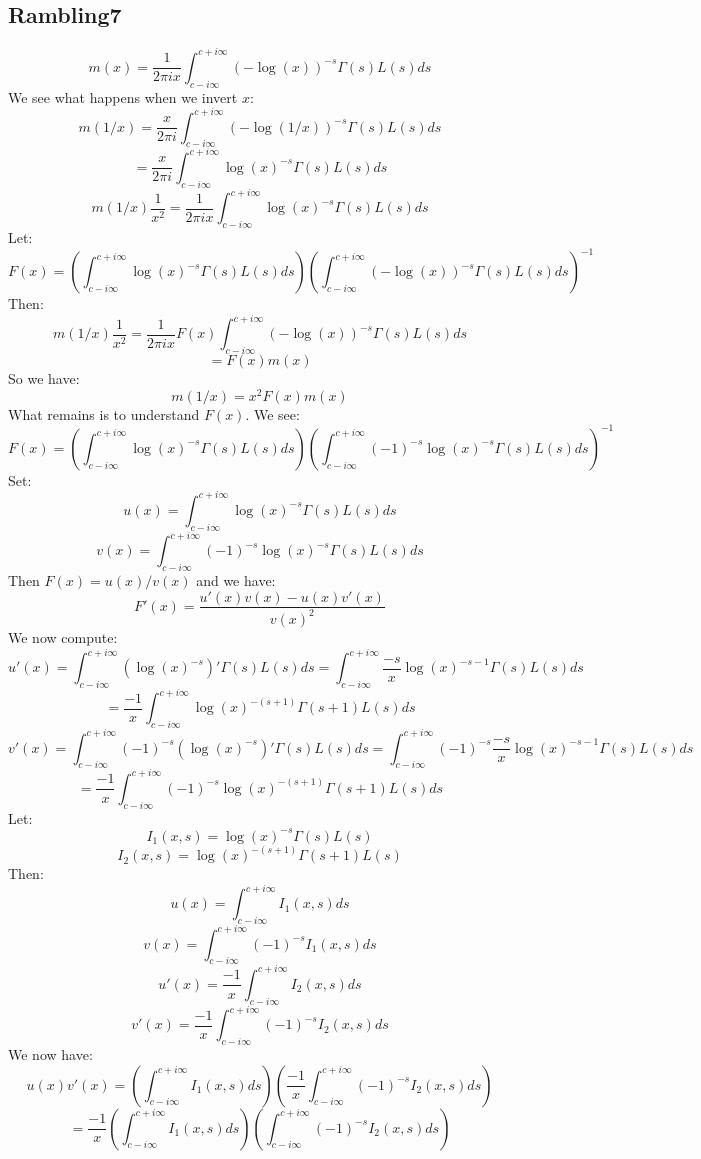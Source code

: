 \documentclass[a4paper]{amsart}
\begin{document}
\subsection{Rambling7}
$$m(x) = \frac{1}{2\pi i x} \int_{c - i\infty}^{c + i\infty}(-\log(x))^{-s} \Gamma(s)L(s)ds$$
We see what happens when we invert $x$:
$$m(1/x) = \frac{x}{2\pi i} \int_{c - i\infty}^{c + i\infty}(-\log(1/x))^{-s} \Gamma(s)L(s)ds$$
$$ = \frac{x}{2\pi i} \int_{c - i\infty}^{c + i\infty}\log(x)^{-s} \Gamma(s)L(s)ds$$
$$m(1/x) \frac{1}{x^2} = \frac{1}{2\pi i x} \int_{c - i\infty}^{c + i\infty}\log(x)^{-s} \Gamma(s)L(s)ds$$
Let:
$$F(x) = \left(\int_{c - i\infty}^{c + i\infty}\log(x)^{-s} \Gamma(s)L(s)ds\right)\left(\int_{c - i\infty}^{c + i\infty}(-\log(x))^{-s} \Gamma(s)L(s)ds\right)^{-1}$$
Then:
$$m(1/x) \frac{1}{x^2} = \frac{1}{2\pi i x} F(x) \int_{c - i\infty}^{c + i\infty}(-\log(x))^{-s} \Gamma(s)L(s)ds$$
$$ = F(x) m(x)$$
So we have:
$$m(1/x) = x^2 F(x) m(x)$$
What remains is to understand $F(x)$. We see:
$$F(x) = \left(\int_{c - i\infty}^{c + i\infty}\log(x)^{-s} \Gamma(s)L(s)ds\right)\left(\int_{c - i\infty}^{c + i\infty}(-1)^{-s} \log(x)^{-s} \Gamma(s)L(s)ds\right)^{-1}$$
Set:
$$u(x) = \int_{c - i\infty}^{c + i\infty}\log(x)^{-s} \Gamma(s)L(s)ds$$
$$v(x) = \int_{c - i\infty}^{c + i\infty}(-1)^{-s} \log(x)^{-s} \Gamma(s)L(s)ds$$
Then $F(x) = u(x)/v(x)$ and we have:
$$F'(x) = \frac{u'(x)v(x) - u(x)v'(x)}{v(x)^2}$$
We now compute:
$$u'(x) = \int_{c - i\infty}^{c + i\infty}(\log(x)^{-s})' \Gamma(s)L(s)ds = \int_{c - i\infty}^{c + i\infty}\frac{-s}{x} \log(x)^{-s-1} \Gamma(s)L(s)ds$$
$$ = \frac{-1}{x} \int_{c - i\infty}^{c + i\infty}\log(x)^{-(s+1)} \Gamma(s + 1)L(s)ds$$
$$v'(x) = \int_{c - i\infty}^{c + i\infty}(-1)^{-s} (\log(x)^{-s})' \Gamma(s)L(s)ds = \int_{c - i\infty}^{c + i\infty}(-1)^{-s} \frac{-s}{x} \log(x)^{-s-1} \Gamma(s)L(s)ds$$
$$ = \frac{-1}{x} \int_{c - i\infty}^{c + i\infty}(-1)^{-s}\log(x)^{-(s+1)} \Gamma(s + 1)L(s)ds$$
Let: 
$$I_1(x, s) = \log(x)^{-s} \Gamma(s) L(s)$$
$$I_2(x, s) = \log(x)^{-(s + 1)} \Gamma(s + 1) L(s)$$
Then:
$$u(x) = \int_{c - i\infty}^{c + i\infty}I_1(x, s)ds$$
$$v(x) = \int_{c - i\infty}^{c + i\infty}(-1)^{-s} I_1(x, s)ds$$
$$u'(x) = \frac{-1}{x} \int_{c - i\infty}^{c + i\infty}I_2(x, s)ds$$
$$v'(x) = \frac{-1}{x} \int_{c - i\infty}^{c + i\infty}(-1)^{-s}I_2(x, s)ds$$
We now have:
$$u(x)v'(x) = \left(\int_{c - i\infty}^{c + i\infty}I_1(x, s)ds\right)\left(\frac{-1}{x} \int_{c - i\infty}^{c + i\infty}(-1)^{-s}I_2(x, s)ds\right)$$
$$ = \frac{-1}{x} \left(\int_{c - i\infty}^{c + i\infty}I_1(x, s)ds\right)\left(\int_{c - i\infty}^{c + i\infty}(-1)^{-s}I_2(x, s)ds\right)$$
\end{document}
